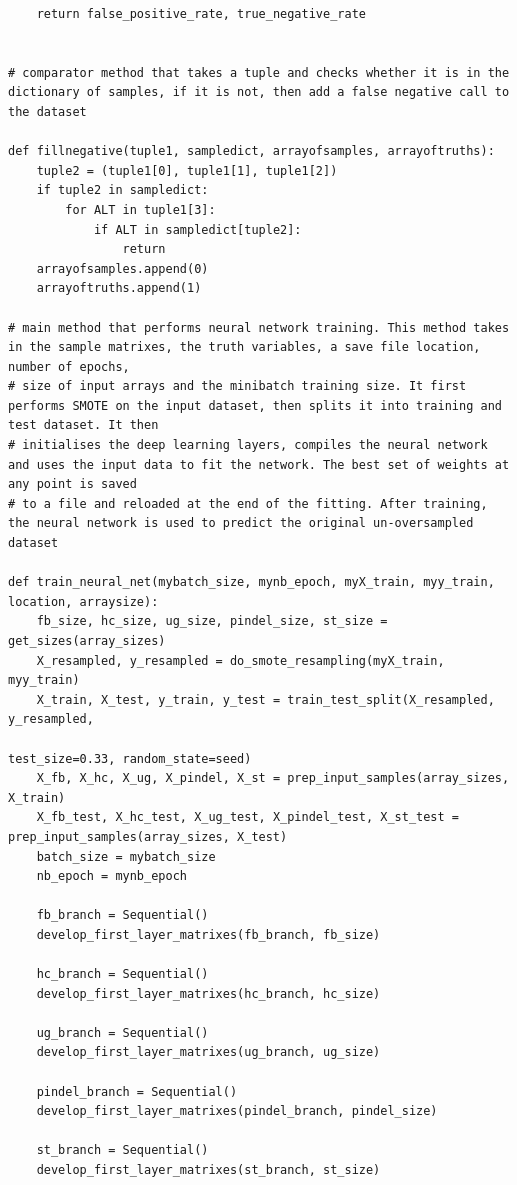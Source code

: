 \documentclass{article}
\begin{document}
\begin{verbatim}
    return false_positive_rate, true_negative_rate


# comparator method that takes a tuple and checks whether it is in the dictionary of samples, if it is not, then add a false negative call to the dataset
	
def fillnegative(tuple1, sampledict, arrayofsamples, arrayoftruths):
    tuple2 = (tuple1[0], tuple1[1], tuple1[2])
    if tuple2 in sampledict:
        for ALT in tuple1[3]:
            if ALT in sampledict[tuple2]:
                return
    arrayofsamples.append(0)
    arrayoftruths.append(1)

# main method that performs neural network training. This method takes in the sample matrixes, the truth variables, a save file location, number of epochs, 
# size of input arrays and the minibatch training size. It first performs SMOTE on the input dataset, then splits it into training and test dataset. It then
# initialises the deep learning layers, compiles the neural network and uses the input data to fit the network. The best set of weights at any point is saved
# to a file and reloaded at the end of the fitting. After training, the neural network is used to predict the original un-oversampled dataset
	
def train_neural_net(mybatch_size, mynb_epoch, myX_train, myy_train, location, arraysize):
    fb_size, hc_size, ug_size, pindel_size, st_size = get_sizes(array_sizes)
    X_resampled, y_resampled = do_smote_resampling(myX_train, myy_train)
    X_train, X_test, y_train, y_test = train_test_split(X_resampled, y_resampled,
                                                        test_size=0.33, random_state=seed)
    X_fb, X_hc, X_ug, X_pindel, X_st = prep_input_samples(array_sizes, X_train)
    X_fb_test, X_hc_test, X_ug_test, X_pindel_test, X_st_test = prep_input_samples(array_sizes, X_test)
    batch_size = mybatch_size
    nb_epoch = mynb_epoch

    fb_branch = Sequential()
    develop_first_layer_matrixes(fb_branch, fb_size)

    hc_branch = Sequential()
    develop_first_layer_matrixes(hc_branch, hc_size)

    ug_branch = Sequential()
    develop_first_layer_matrixes(ug_branch, ug_size)

    pindel_branch = Sequential()
    develop_first_layer_matrixes(pindel_branch, pindel_size)

    st_branch = Sequential()
    develop_first_layer_matrixes(st_branch, st_size)


\end{verbatim}
\end{document}
